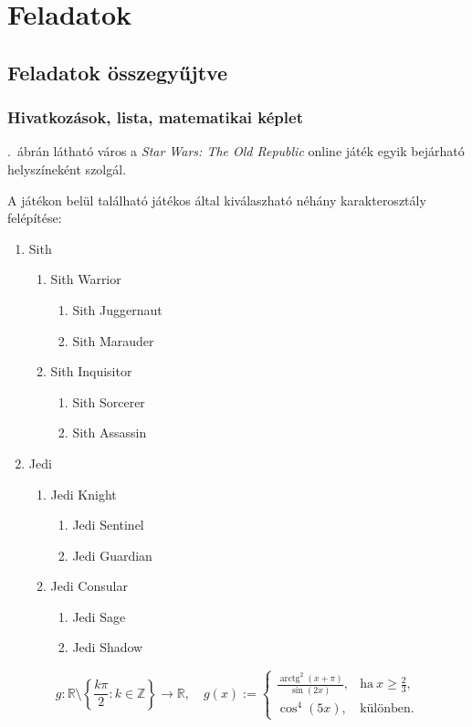 \documentclass{thesis-ekf}
\DeclareMathOperator{\arctg}{arctg}
\theoremstyle{definition}
\begin{document}
\chapter{Feladatok}
\section{Feladatok összegyűjtve}
\subsection{Hivatkozások, lista, matematikai képlet}
\Az{\ref{figure-kaascity}}.~ábrán látható város a \emph{Star Wars: The Old Republic} online játék egyik bejárható helyszíneként szolgál. 

A játékon belül található játékos által kiválaszható néhány karakterosztály felépítése:
\begin{enumerate}
	\item Sith
	\begin{enumerate}
		\item Sith Warrior
		\begin{enumerate}
			\item Sith Juggernaut
			\item Sith Marauder
		\end{enumerate}
		\item Sith Inquisitor
		\begin{enumerate}
			\item Sith Sorcerer
			\item Sith Assassin
		\end{enumerate}
	\end{enumerate}
	\item Jedi
	\begin{enumerate}
		\item Jedi Knight
		\begin{enumerate}
			\item Jedi Sentinel
			\item Jedi Guardian
		\end{enumerate}
		\item Jedi Consular
		\begin{enumerate}
			\item Jedi Sage
			\item Jedi Shadow
		\end{enumerate}
	\end{enumerate}
\end{enumerate}
\begin{equation}\label{eq-beadando}
	g\colon \mathbb{R} \setminus \left\{\frac{k\pi}{2} \colon k \in\mathbb{Z}\right\} \rightarrow \mathbb{R},\quad g(x):=
	\begin{cases}
		\frac{\arctg^2(x+\pi)}{\sin(2x)},& \text{ha}\ x\geq\frac{2}{3}, \\
		\cos^4(5x),& \text{különben}.
	\end{cases}	 
\end{equation}
\end{document}
